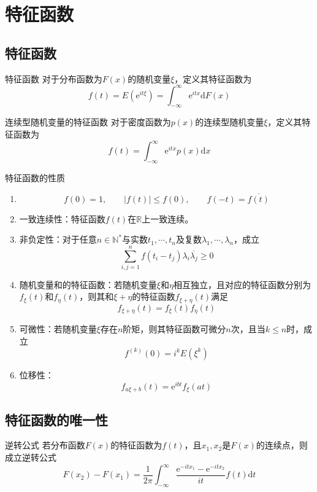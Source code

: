 \documentclass[lang = cn, scheme = chinese, thmcnt = section]{elegantbook}
\newcommand{\N}{\mathbb{N}}            %
\newcommand{\R}{\mathbb{R}}            %
\begin{document}
\section{特征函数}

\subsection{特征函数}

\begin{definition}{特征函数}
	对于分布函数为$F(x)$的随机变量$\xi$，定义其特征函数为%
	$$
	f(t)=E(\mathrm{e}^{it\xi})=\int_{-\infty}^{\infty}{\mathrm{e}^{itx}\mathrm{d}F(x)}
	$$
\end{definition}

\begin{definition}{连续型随机变量的特征函数}
	对于密度函数为$p(x)$的连续型随机变量$\xi$，定义其特征函数为%
	$$
	f(t)=\int_{-\infty}^{\infty}{\mathrm{e}^{itx}p(x)\mathrm{d}x}
	$$
\end{definition}

\begin{proposition}{特征函数的性质}
	\begin{enumerate}
		\item %
		$$
		f(0)=1,\qquad 
		|f(t)|\le f(0),\qquad 
		f(-t)=\overline{f(t)}
		$$
		\item 一致连续性：特征函数$f(t)$在$\R$上一致连续。
		\item 非负定性：对于任意$n\in \N^*$与实数$t_1,\cdots,t_n$及复数$\lambda_1,\cdots,\lambda_n$，成立
		$$
		\sum_{i,j=1}^{n}{f(t_i-t_j)\lambda_i\overline{\lambda_j}}\ge 0
		$$
		\item 随机变量和的特征函数：若随机变量$\xi$和$\eta$相互独立，且对应的特征函数分别为$f_{\xi}(t)$和$f_{\eta}(t)$，则其和$\xi+\eta$的特征函数$f_{\xi+\eta}(t)$满足
		$$
		f_{\xi+\eta}(t)=f_{\xi}(t)f_{\eta}(t)
		$$
		\item 可微性：若随机变量$\xi$存在$n$阶矩，则其特征函数可微分$n$次，且当$k\le n$时，成立
		$$
		f^{(k)}(0)=i^kE(\xi^k)
		$$
		\item 位移性：
		$$
		f_{a\xi+b}(t)=\mathrm{e}^{ibt}f_{\xi}(at)
		$$
	\end{enumerate}
\end{proposition}

\subsection{特征函数的唯一性}

\begin{theorem}{逆转公式}
	若分布函数$F(x)$的特征函数为$f(t)$，且$x_1,x_2$是$F(x)$的连续点，则成立逆转公式
	$$
	F(x_2)-F(x_1)=\frac{1}{2\pi}\int_{-\infty}^{\infty}{\frac{\mathrm{e}^{-itx_1}-\mathrm{e}^{-itx_2}}{it}f(t)\mathrm{d}t}
	$$
\end{theorem}
\end{document}
